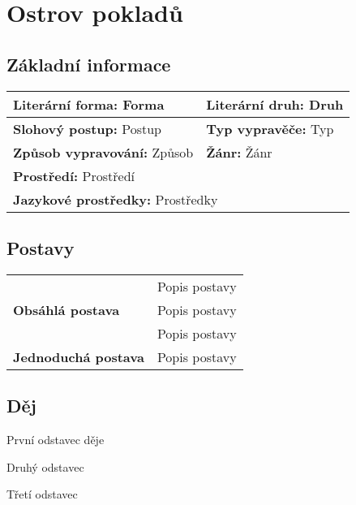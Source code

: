 \section{Ostrov pokladů}
    \subsection*{Základní informace}
        \begin{center}
            \begin{tabular}{l|l}
                \textbf{Literární forma:} Forma & \textbf{Literární druh:} Druh \\
                \hline
                \textbf{Slohový postup:} Postup & \textbf{Typ vypravěče:} Typ \\
                \hline
                \textbf{Způsob vypravování:} Způsob & \textbf{Žánr:} Žánr \\
                \hline
                \multicolumn{2}{l}{\textbf{Prostředí:} Prostředí} \\
                \hline
                \multicolumn{2}{l}{\textbf{Jazykové prostředky:} Prostředky} \\
            \end{tabular}
        \end{center}
    \subsection*{Postavy}
        \begin{center}
            \begin{tabular}{l|l}
                \multirow{3}{15em}{\textbf{Obsáhlá postava}} & Popis postavy \\
                & Popis postavy \\
                & Popis postavy \\
                \hline
                \textbf{Jednoduchá postava} & Popis postavy \\
            \end{tabular}
        \end{center}
    \subsection*{Děj}
        První odstavec děje

        Druhý odstavec
        
        Třetí odstavec
